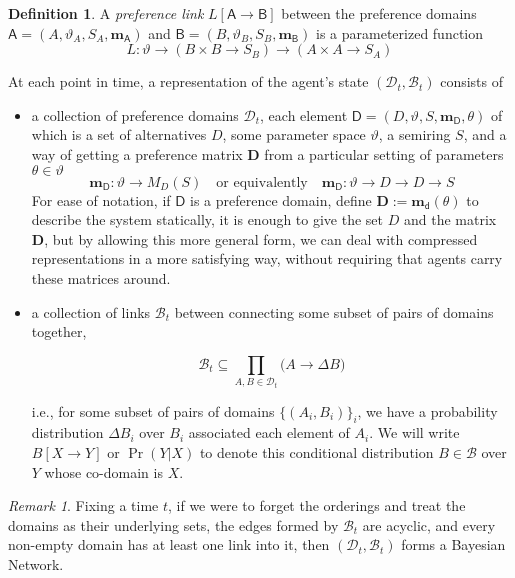 \documentclass{article}
\theoremstyle{plain}
\theoremstyle{definition}
\newtheorem{defn}{Definition}[section]
\theoremstyle{remark}
\newtheorem*{remark}{Remark}
\newcommand\mat[1]{\mathbf #1}
\newcommand\m[1]{\mathbf m_{\mathsf #1}}
\begin{document}
	\begin{defn}
		A \emph{preference link} $L [\mathsf A \to \mathsf B]$ between the preference domains $\mathsf A = (A, \vartheta_A, S_A, \m A)$ and $\mathsf B = (B, \vartheta_B, S_B, \m B)$ is a parameterized function 
		\[ L : \vartheta \to (B \times B \to S_B) \to (A \times A \to S_A)  \]
	\end{defn}
	
	At each point in time, a representation of the agent's state $(\mathcal D_t, \mathcal B_t)$ consists of 
	
	\begin{itemize}
		\item a collection of preference domains $\mathcal D_t$, each element $\mathsf D = (D, \vartheta, S, \m D, \theta)$ of which is a set of alternatives $D$, some parameter space $\vartheta$, a semiring $S$, and a way of getting a preference matrix $\mat D$ from a particular setting of parameters $\theta \in \vartheta$
		\[ \m D: \vartheta \to M_D(S) \quad\text{or equivalently}\quad \m D : \vartheta \to D \to D \to S \]
		For ease of notation, if $\mathsf D$ is a preference domain, define $\mat D := \m d(\theta)$
		to describe the system statically, it is enough to give the set $D$ and the matrix $\mat D$, but by allowing this more general form, we can deal with compressed representations in a more satisfying way, without requiring that agents carry these matrices around.
		
		\item a collection of links $\mathcal B_t$ between connecting some subset of pairs of domains together,	
		
		\[  \mathcal B_t \subseteq \prod_{A, B \in \mathcal D_t} \Big( A \to \Delta B \Big) \] 
		
		i.e., for some subset of pairs of domains $\{ (A_i, B_i) \}_i$, we have a probability distribution $\Delta B_i$ over $B_i$ associated each element of $A_i$. We will write $B [X \to Y]$ or $\Pr(Y | X)$ to denote this conditional distribution $B \in \mathcal B$ over $Y$ whose co-domain is $X$.
	\end{itemize}
	
	
	
	\begin{remark}
		Fixing a time $t$, if we were to forget the orderings and treat the domains as their underlying sets, the edges formed by $\mathcal B_t$ are acyclic, and every non-empty domain has at least one link into it, then $(\mathcal D_t, \mathcal B_t)$ forms a Bayesian Network.
	\end{remark}
 
\end{document}
